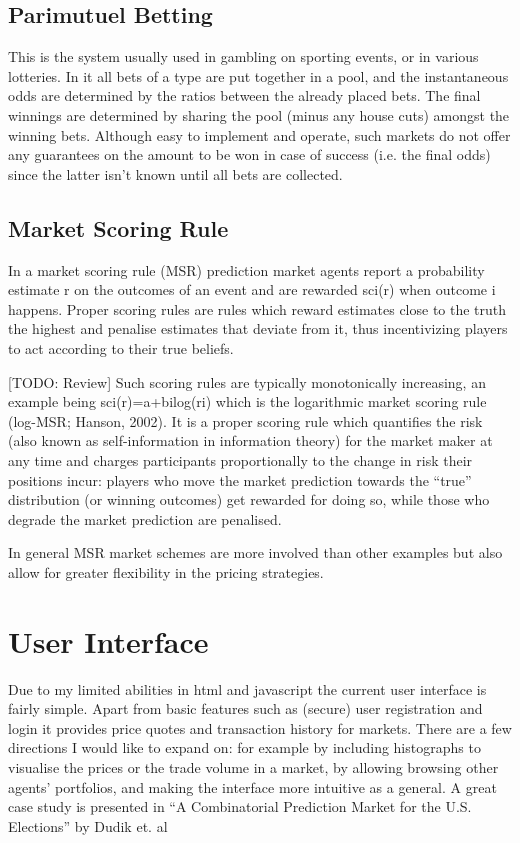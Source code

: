 \documentclass[bsc,frontabs,twoside,singlespacing,parskip,deptreport]{infthesis}     %
\begin{document}
\subsection{Parimutuel Betting}
This is the system usually used in gambling on sporting events, or in various lotteries. In it all bets of a type are put together in a pool, and the instantaneous odds are determined by the ratios between the already placed bets. The final winnings are determined by sharing the pool (minus any house cuts) amongst the winning bets. Although easy to implement and operate, such markets do not offer any guarantees on the amount to be won in case of success (i.e. the final odds) since the latter isn’t known until all bets are collected.

\subsection{Market Scoring Rule}
In a market scoring rule (MSR) prediction market agents report a probability estimate r on the outcomes of an event and are rewarded sci(r) when outcome i happens. Proper scoring rules are rules which reward estimates close to the truth the highest and penalise estimates that deviate from it, thus incentivizing players to act according to their true beliefs.

 [TODO: Review] Such scoring rules are typically monotonically increasing, an example being sci(r)=a+bilog(ri) which is the logarithmic market scoring rule (log-MSR; Hanson, 2002). It is a proper scoring rule which quantifies the risk (also known as self-information in information theory) for the market maker at any time and charges participants proportionally to the change in risk their positions incur: players who move the market prediction towards the “true” distribution (or winning outcomes) get rewarded for doing so, while those who degrade the market prediction are penalised.

In general MSR market schemes are more involved than other examples but also allow for greater flexibility in the pricing strategies. 

\section{User Interface}

	Due to my limited abilities in html and javascript the current user interface is fairly simple. Apart from basic features such as (secure) user registration and login it provides price quotes and transaction history for markets. There are a few directions I would like to expand on: for example by including histographs to visualise the prices or the trade volume in a market, by allowing browsing other agents’ portfolios, and making the interface more intuitive as a general. A great case study is presented in “A Combinatorial Prediction Market for the U.S. Elections” by Dudik et. al
\end{document}
